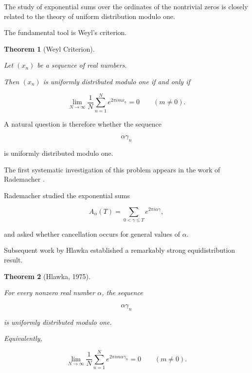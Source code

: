 \documentclass[11pt]{amsart}
\numberwithin{equation}{section}
\theoremstyle{plain}
\newtheorem{theorem}{Theorem}[section]
\theoremstyle{definition}
\theoremstyle{remark}
\begin{document}
The study of exponential sums over the ordinates of the nontrivial
zeros is closely related to the theory of uniform distribution modulo
one.

The fundamental tool is Weyl's criterion.

\begin{theorem}[Weyl Criterion]
\label{thm:weyl_criterion}

Let $(x_n)$ be a sequence of real numbers.

Then $(x_n)$ is uniformly distributed modulo one if and only if

\begin{equation}
\lim_{N\to\infty}
\frac{1}{N}
\sum_{n=1}^{N}
e^{2\pi i m x_n}
=
0
\qquad
(m\neq 0).
\label{eq:weyl_criterion}
\end{equation}

\end{theorem}

A natural question is therefore whether the sequence

\begin{equation}
\alpha \gamma_n
\label{eq:alpha_gamma_sequence}
\end{equation}

is uniformly distributed modulo one.

The first systematic investigation of this problem appears in the work
of Rademacher \cite{Rademacher1956}.

Rademacher studied the exponential sums

\begin{equation}
A_\alpha(T)
=
\sum_{0<\gamma\le T}
e^{2\pi i \alpha \gamma},
\label{eq:rademacher_sum}
\end{equation}

and asked whether cancellation occurs for general values of
$\alpha$.

Subsequent work by Hlawka established a remarkably strong
equidistribution result.

\begin{theorem}[Hlawka, 1975]
\label{thm:hlawka}

For every nonzero real number $\alpha$,
the sequence

\begin{equation}
\alpha \gamma_n
\label{eq:hlawka_sequence}
\end{equation}

is uniformly distributed modulo one.

Equivalently,

\begin{equation}
\lim_{N\to\infty}
\frac{1}{N}
\sum_{n=1}^{N}
e^{2\pi i m \alpha \gamma_n}
=
0
\qquad
(m\neq 0).
\label{eq:hlawka_weyl}
\end{equation}

\end{theorem}
\end{document}
